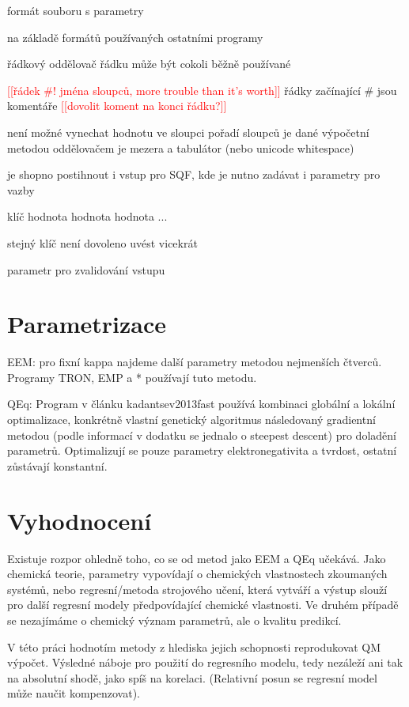 \documentclass[10pt,draft,oneside]{fithesis2}
\newcommand\fixme[1]{\textcolor{red}{[[#1]]}}
\begin{document}
formát souboru s parametry

na základě formátů používaných ostatními programy

řádkový
oddělovač řádku může být cokoli běžně používané

\fixme{řádek #! jména sloupců, more trouble than it's worth}
řádky začínající # jsou komentáře \fixme{dovolit koment na konci řádku?}

není možné vynechat hodnotu ve sloupci
pořadí sloupců je dané výpočetní metodou
oddělovačem je mezera a tabulátor (nebo unicode whitespace)

je shopno postihnout i vstup pro SQF, kde je nutno zadávat i parametry pro vazby

klíč hodnota hodnota hodnota ...

stejný klíč není dovoleno uvést vicekrát

parametr pro zvalidování vstupu


\chapter{Parametrizace}

EEM: pro fixní kappa najdeme další parametry metodou nejmenších čtverců. Programy TRON, EMP a * používají tuto metodu.

QEq: Program v článku kadantsev2013fast používá kombinaci globální a lokální optimalizace, konkrétně vlastní genetický algoritmus následovaný gradientní metodou (podle informací v dodatku se jednalo o steepest descent) pro doladění parametrů. Optimalizují se pouze parametry elektronegativita a tvrdost, ostatní zůstávají konstantní.

\chapter{Vyhodnocení}

Existuje rozpor ohledně toho, co se od metod jako EEM a QEq učekává. Jako chemická teorie, parametry vypovídají o chemických vlastnostech zkoumaných systémů, nebo regresní/metoda strojového učení, která vytváří a výstup slouží pro další regresní modely předpovídající chemické vlastnosti. Ve druhém případě se nezajímáme o chemický význam parametrů, ale o kvalitu predikcí.

V této práci hodnotím metody z hlediska jejich schopnosti reprodukovat QM výpočet. Výsledné náboje pro použití do regresního modelu, tedy nezáleží ani tak na absolutní shodě, jako spíš na korelaci. (Relativní posun se regresní model může naučit kompenzovat).
\end{document}
